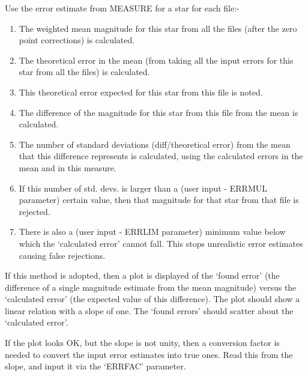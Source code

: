 {{{              Use the error estimate from MEASURE for a star for each 
              file:- 

               \begin{enumerate}
               \item The weighted mean magnitude for this star from all 
                  the files (after the zero point corrections) is 
                  calculated.
               \item The theoretical error in the mean (from taking all 
                  the input errors for this star from all the files) is
                  calculated. 
               \item This theoretical error expected for this star from 
                  this file is noted.
               \item The difference of the magnitude for this star from 
                  this file from the mean is calculated.
               \item  The number of standard deviations (diff/theoretical 
                  error) from the mean that this difference represents 
                  is calculated, using the calculated errors in the 
                  mean and in this measure.
               \item If this number of std. devs. is larger than a (user 
                  input - ERRMUL parameter) certain value, then that 
                  magnitude for that 
                  star from that file is rejected.
               \item There is also a (user input - ERRLIM parameter) 
                  minimum value below which the `calculated error'
                  cannot fall. This stops unrealistic error estimates
                  causing false rejections.
               \end{enumerate}

               If this method is adopted, then a plot is
               displayed of the `found error' (the difference of a 
               single magnitude estimate from the mean magnitude) 
               versus the `calculated error' (the expected value of 
               this difference). The plot should show a linear 
               relation with a slope of one. The `found errors' should 
               scatter about the `calculated error'. 

               If the plot looks OK, but the slope is not unity, then
               a conversion factor is needed to convert the input
               error estimates into true ones. Read this from the slope,
               and input it via the `ERRFAC' parameter.
               
}}}
